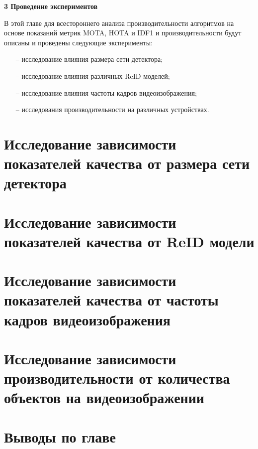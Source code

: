 \newpage
\begin{flushleft}
  \textbf{\large 3 Проведение экспериментов}
\end{flushleft}
В этой главе для всестороннего анализа производительности алгоритмов на основе показаний метрик MOTA, HOTA и IDF1 и производительности будут описаны и проведены следующие эксперименты:
\begin{itemize}
  \item[--] исследование влияния размера сети детектора;
  \item[--] исследование влияния различных ReID моделей;
  \item[--] исследование влияния частоты кадров видеоизображения;
  \item[--] исследования производительности на различных устройствах.
\end{itemize}


\section{Исследование зависимости показателей качества от размера сети детектора}



\section{Исследование зависимости показателей качества от ReID модели}


\section{Исследование зависимости показателей качества от частоты кадров видеоизображения}


\section{Исследование зависимости производительности от количества объектов на видеоизображении}

\section{Выводы по главе}
